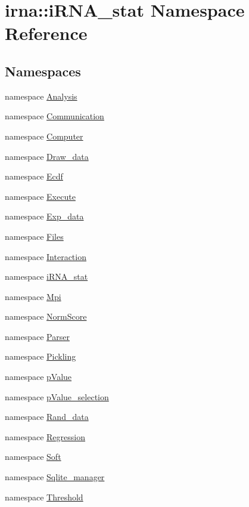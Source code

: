 \hypertarget{namespaceirna_1_1iRNA__stat}{
\section{irna\-:\-:i\-R\-N\-A\-\_\-stat \-Namespace \-Reference}
\label{namespaceirna_1_1iRNA__stat}
}
\subsection*{\-Namespaces}
\begin{DoxyCompactItemize}
\item 
namespace \hyperlink{namespaceirna_1_1iRNA__stat_1_1Analysis}{\-Analysis}
\item 
namespace \hyperlink{namespaceirna_1_1iRNA__stat_1_1Communication}{\-Communication}
\item 
namespace \hyperlink{namespaceirna_1_1iRNA__stat_1_1Computer}{\-Computer}
\item 
namespace \hyperlink{namespaceirna_1_1iRNA__stat_1_1Draw__data}{\-Draw\-\_\-data}
\item 
namespace \hyperlink{namespaceirna_1_1iRNA__stat_1_1Ecdf}{\-Ecdf}
\item 
namespace \hyperlink{namespaceirna_1_1iRNA__stat_1_1Execute}{\-Execute}
\item 
namespace \hyperlink{namespaceirna_1_1iRNA__stat_1_1Exp__data}{\-Exp\-\_\-data}
\item 
namespace \hyperlink{namespaceirna_1_1iRNA__stat_1_1Files}{\-Files}
\item 
namespace \hyperlink{namespaceirna_1_1iRNA__stat_1_1Interaction}{\-Interaction}
\item 
namespace \hyperlink{namespaceirna_1_1iRNA__stat_1_1iRNA__stat}{i\-R\-N\-A\-\_\-stat}
\item 
namespace \hyperlink{namespaceirna_1_1iRNA__stat_1_1Mpi}{\-Mpi}
\item 
namespace \hyperlink{namespaceirna_1_1iRNA__stat_1_1NormScore}{\-Norm\-Score}
\item 
namespace \hyperlink{namespaceirna_1_1iRNA__stat_1_1Parser}{\-Parser}
\item 
namespace \hyperlink{namespaceirna_1_1iRNA__stat_1_1Pickling}{\-Pickling}
\item 
namespace \hyperlink{namespaceirna_1_1iRNA__stat_1_1pValue}{p\-Value}
\item 
namespace \hyperlink{namespaceirna_1_1iRNA__stat_1_1pValue__selection}{p\-Value\-\_\-selection}
\item 
namespace \hyperlink{namespaceirna_1_1iRNA__stat_1_1Rand__data}{\-Rand\-\_\-data}
\item 
namespace \hyperlink{namespaceirna_1_1iRNA__stat_1_1Regression}{\-Regression}
\item 
namespace \hyperlink{namespaceirna_1_1iRNA__stat_1_1Soft}{\-Soft}
\item 
namespace \hyperlink{namespaceirna_1_1iRNA__stat_1_1Sqlite__manager}{\-Sqlite\-\_\-manager}
\item 
namespace \hyperlink{namespaceirna_1_1iRNA__stat_1_1Threshold}{\-Threshold}
\end{DoxyCompactItemize}
